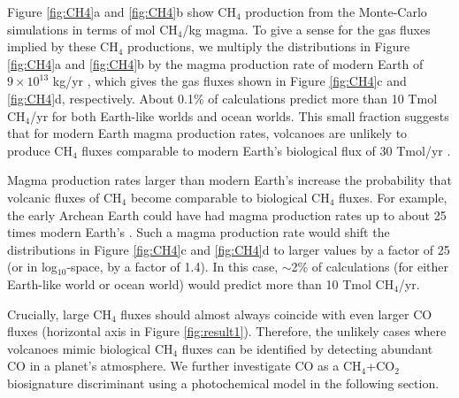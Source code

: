 Figure \ref{fig:CH4}a and \ref{fig:CH4}b show CH$_4$ production from the Monte-Carlo simulations in terms of mol CH$_4$/kg magma. To give a sense for the gas fluxes implied by these CH$_4$ productions, we multiply the distributions in Figure \ref{fig:CH4}a and \ref{fig:CH4}b by the magma production rate of modern Earth of $9\times10^{13}$ kg/yr \citep{Crisp_1984}, which gives the gas fluxes shown in Figure \ref{fig:CH4}c and \ref{fig:CH4}d, respectively. About 0.1\% of calculations predict more than 10 Tmol CH$_4$/yr for both Earth-like worlds and ocean worlds. This small fraction suggests that for modern Earth magma production rates, volcanoes are unlikely to produce CH$_4$ fluxes comparable to modern Earth's biological flux of 30 Tmol/yr \citep{Hauglustaine_2007}.

Magma production rates larger than modern Earth's increase the probability that volcanic fluxes of CH$_4$ become comparable to biological CH$_4$ fluxes. For example, the early Archean Earth could have had magma production rates up to about 25 times modern Earth's \citep{Sleep_2001}. Such a magma production rate would shift the distributions in Figure \ref{fig:CH4}c and \ref{fig:CH4}d to larger values by a factor of 25 (or in log$_{10}$-space, by a factor of 1.4). In this case, $\sim$2\% of calculations (for either Earth-like world or ocean world) would predict more than 10 Tmol CH$_4$/yr. 

Crucially, large CH$_4$ fluxes should almost always coincide with even larger CO fluxes (horizontal axis in Figure \ref{fig:result1}). Therefore, the unlikely cases where volcanoes mimic biological CH$_4$ fluxes can be identified by detecting abundant CO in a planet's atmosphere. We further investigate CO as a CH$_4$+CO$_2$ biosignature discriminant using a photochemical model in the following section.

